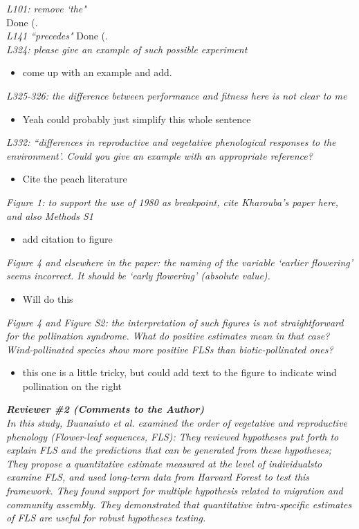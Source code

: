 \documentclass{article}[11pt]
\begin{document}
\emph{L101: remove `the"}\\
Done (.\\
\emph{L141 ``precedes"}
Done (.\\
\emph{L324: please give an example of such possible experiment}
\begin{itemize}
\item come up with an example and add.
\end{itemize}
\emph{L325-326: the difference between performance and fitness here is not clear to me}
\begin{itemize}
\item Yeah could probably just simplify this whole sentence
\end{itemize}
\emph{L332: ``differences in reproductive and vegetative phenological responses to the environment'. Could you give an example with an appropriate reference?}
\begin{itemize}
\item Cite the peach literature
\end{itemize}
\emph{Figure 1: to support the use of 1980 as breakpoint, cite Kharouba's paper here, and also Methods S1}
\begin{itemize}
\item add citation to figure
\end{itemize}
\emph{Figure 4 and elsewhere in the paper: the naming of the variable ‘earlier flowering’ seems incorrect. It should be ‘early flowering’ (absolute value).}
\begin{itemize}
\item Will do this
\end{itemize}
\emph{Figure 4 and Figure S2: the interpretation of such figures is not straightforward for the pollination syndrome. What do positive estimates mean in that case? Wind-pollinated species show more positive FLSs than biotic-pollinated ones?}
\begin{itemize}
\item this one is a little tricky, but could add text to the figure to indicate wind pollination on the right
\end{itemize}

\emph{{\bf Reviewer \#2 (Comments to the Author)}}\\
\emph{In this study, Buanaiuto et al. examined the order of vegetative and reproductive phenology (Flower-leaf sequences, FLS): They reviewed hypotheses put forth to explain FLS and the predictions that can be generated from these hypotheses; They propose a  quantitative estimate measured at the level of individualsto examine FLS, and used long-term data from Harvard Forest to test this framework. They found support for multiple hypothesis related to migration and community assembly. They demonstrated that quantitative intra-specific estimates of FLS are useful for robust hypotheses testing.}\\
\end{document}
